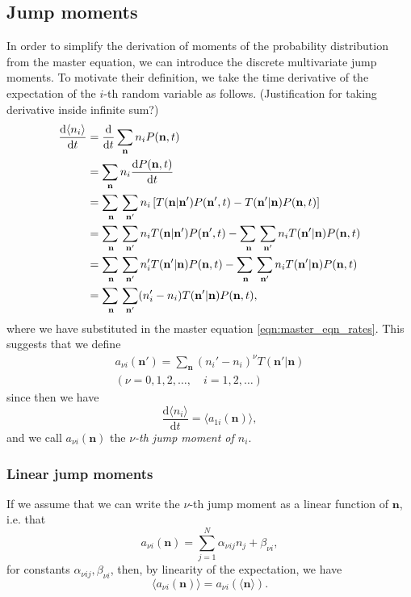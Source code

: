 \documentclass[a4paper,11pt]{report}
\numberwithin{equation}{section}
\newcommand{\diff}[2]{\frac{\mathrm{d} #1}{\mathrm{d} #2}}
\newcommand{\V}[1]{\mathbf{#1}}
\newcommand{\E}[1]{\langle #1 \rangle}
\begin{document}
\subsection{Jump moments}
In order to simplify the derivation of moments of the probability distribution
from the master equation, we can introduce the discrete multivariate jump
moments. To motivate their definition, we take the time derivative of the
expectation of the \(i\)-th random variable as follows. (Justification for
taking derivative inside infinite sum?)
\begin{align*}
    \diff{\E{n_i}}{t} &= \diff{}{t}\sum_{\V{n}}n_i P(\V{n},t)\\
    &= \sum_{\V{n}}n_i \diff{P(\V{n},t)}{t}\\
    &= \adjustlimits\sum_{\V{n}}\sum_{\V{n}'} n_i \left[ T(\V{n}|\V{n}') P(\V{n}',t) -
    T(\V{n}'|\V{n}) P(\V{n},t)\right]\\
    &= \adjustlimits\sum_{\V{n}}\sum_{\V{n}'} n_i T(\V{n}|\V{n}') P(\V{n}',t) -
    \adjustlimits\sum_{\V{n}}\sum_{\V{n}'} n_i T(\V{n}'|\V{n}) P(\V{n},t)\\
    &= \adjustlimits\sum_{\V{n}}\sum_{\V{n}'} n_i' T(\V{n}'|\V{n}) P(\V{n},t) -
    \adjustlimits\sum_{\V{n}}\sum_{\V{n}'} n_i T(\V{n}'|\V{n}) P(\V{n},t)\\
    &= \adjustlimits\sum_{\V{n}}\sum_{\V{n}'} (n_i' - n_i) T(\V{n}'|\V{n})
    P(\V{n},t),
\end{align*}
where we have substituted in the master equation \eqref{eqn:master_eqn_rates}.
This suggests that we define
\begin{equation}
    \begin{gathered}
        a_{\nu i}(\V{n}') = \sum_{\V{n}} (n_i'-n_i)^\nu T(\V{n}'|\V{n})\\
        (\nu = 0,1,2,\dotsc,\quad i=1,2,\dotsc)
    \end{gathered}
    \label{eqn:jump_moment}
\end{equation}
since then we have
\begin{equation}
    \diff{\E{n_i}}{t} = \E{a_{1i}(\V{n})},
    \label{eqn:time_evo_expectation_jump_moment}
\end{equation}
and we call \(a_{\nu i}(\V{n})\) the \emph{\(\nu\)-th jump moment of \(n_i\)}.

\subsubsection{Linear jump moments}
If we assume that we can write the \(\nu\)-th jump moment as a linear function of
\(\V{n}\), i.e. that
\begin{equation}
    a_{\nu i}(\V{n}) = \sum_{j=1}^{N} \alpha_{\nu i j} n_j + \beta_{\nu i},
    \label{eqn:linear_jump_moments_coeffs}
\end{equation}
for constants \(\alpha_{\nu i j}, \beta_{\nu i}\),
then, by linearity of the expectation, we have
\begin{equation}
    \E{a_{\nu i}(\V{n})} = a_{\nu i}(\E{\V{n}}).
    \label{eqn:linear_jump_moments}
\end{equation}
\end{document}
